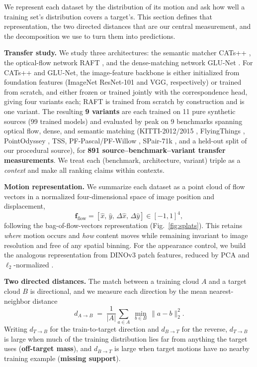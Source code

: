 \documentclass[runningheads]{llncs}
\newcommand{\dtb}{d_{T\to B}}
\newcommand{\dbt}{d_{B\to T}}
\begin{document}
We represent each dataset by the distribution of its motion and ask how well a
training set's distribution covers a target's. This section defines that
representation, the two directed distances that are our central measurement,
and the decomposition we use to turn them into predictions.

\noindent\textbf{Transfer study.}
We study three architectures: the semantic matcher CATs++
\cite{cho2022cats++}, the optical-flow network RAFT \cite{teed2020raft}, and
the dense-matching network GLU-Net \cite{truong2020glunet}. For CATs++ and
GLU-Net, the image-feature backbone is either initialized from foundation
features (ImageNet ResNet-101 and VGG, respectively) or trained from scratch,
and either frozen or trained jointly with the correspondence head, giving four
variants each; RAFT is trained from scratch by construction and is one
variant. The resulting \textbf{9 variants} are each trained on 11 pure
synthetic sources (99 trained models) and evaluated by peak  on 9
benchmarks spanning
optical flow, dense, and semantic matching (KITTI-2012/2015 \cite{kitti_flow},
FlyingThings \cite{mayer2016FlyingThingsDataset}, PointOdyssey
\cite{pointodyssey}, TSS, PF-Pascal/PF-Willow \cite{pfpascal}, SPair-71k
\cite{spair71k}, and a held-out split of our procedural source), for
\textbf{891 source--benchmark--variant transfer measurements}. We treat each (benchmark, architecture,
variant) triple as a \emph{context} and make all ranking claims within
contexts.

\noindent\textbf{Motion representation.}
We summarize each dataset as a point cloud of flow vectors in a normalized
four-dimensional space of image position and displacement,
\begin{equation}
\mathbf{f}_{\text{flow}} = [\hat{x},\, \hat{y},\, \Delta\hat{x},\,
\Delta\hat{y}] \in [-1,1]^4,
\label{eq:bfv}
\end{equation}
following the bag-of-flow-vectors representation (Fig.~\ref{fig:splats}). This
retains \emph{where} motion occurs and \emph{how} content moves while remaining
invariant to image resolution and free of any spatial binning. For the
appearance control, we build the analogous representation from DINOv3 patch
features, reduced by PCA and $\ell_2$-normalized \cite{simeoni2025dinov3}.

\noindent\textbf{Two directed distances.}
The match between a training cloud $A$ and a target cloud $B$ is directional,
and we measure each direction by the mean nearest-neighbor distance
\begin{equation}
d_{A \to B} \;=\; \frac{1}{|A|}\sum_{a \in A}\; \min_{b \in B}\,
\lVert a - b \rVert_2^2 .
\label{eq:dirdist}
\end{equation}
Writing $\dtb$ for the train-to-target direction and $\dbt$ for the reverse,
$\dtb$ is large when much of the training distribution lies far from anything
the target uses (\textbf{off-target mass}), and $\dbt$ is large when target
motions have no nearby training example (\textbf{missing support}).
\end{document}
